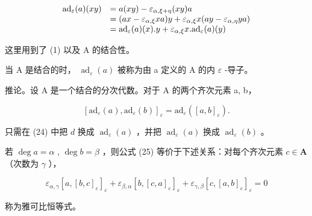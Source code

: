 \[
\begin{array}{r l} \mathrm{ad} _ {\varepsilon} (a) (x y) & = a (x y) - \varepsilon_ {\alpha , \xi + \eta} (x y) a \\ & = (a x - \varepsilon_ {\alpha , \xi} x a) y + \varepsilon_ {\alpha , \xi} x (a y - \varepsilon_ {\alpha , \eta} y a) \\ & = \mathrm{ad} _ {\varepsilon} (a) (x). y + \varepsilon_ {\alpha , \xi} x. \mathrm{ad} _ {\varepsilon} (a) (y) \end{array}
\]

这里用到了 (1) 以及 A 的结合性。

当 A 是结合的时， \(\operatorname{ad}_{\varepsilon}(a)\) 被称为由 a 定义的 A 的内 \(\varepsilon\) -导子。

推论。设 A 是一个结合的分次代数。对于 A 的两个齐次元素 a, b，

\[
[ \mathrm{ad} _ {\varepsilon} (a), \mathrm{ad} _ {\varepsilon} (b) ] _ {\varepsilon} = \mathrm{ad} _ {\varepsilon} ([ a, b ] _ {\varepsilon}).\tag{25}
\]

只需在 (24) 中把 \(d\) 换成 \(\operatorname{ad}_{\varepsilon}(a)\) ，并把 \(\operatorname{ad}_{\varepsilon}(a)\) 换成 \(\operatorname{ad}_{\varepsilon}(b)\) 。

若 \(\deg a = \alpha\) , \(\deg b = \beta\) ，则公式 (25) 等价于下述关系：对每个齐次元素 \(c \in \mathbf{A}\) （次数为 \(\gamma\) ），

\[
\varepsilon_ {\alpha , \gamma} [ a, [ b, c ] _ {\varepsilon} ] _ {\varepsilon} + \varepsilon_ {\beta , \alpha} [ b, [ c, a ] _ {\varepsilon} ] _ {\varepsilon} + \varepsilon_ {\gamma , \beta} [ c, [ a, b ] _ {\varepsilon} ] _ {\varepsilon} = 0\tag{26}
\]

称为雅可比恒等式。


